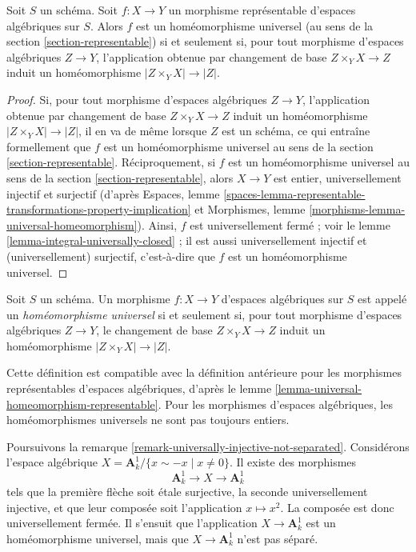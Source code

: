 \begin{lemma}
\label{lemma-universal-homeomorphism-representable}
Soit $S$ un schéma.
Soit $f : X \to Y$ un morphisme représentable d'espaces algébriques sur $S$.
Alors $f$ est un homéomorphisme universel
(au sens de la section \ref{section-representable}) si et seulement si,
pour tout morphisme d'espaces algébriques $Z \to Y$, l'application obtenue par
changement de base $Z \times_Y X \to Z$ induit un homéomorphisme
$|Z \times_Y X| \to |Z|$.
\end{lemma}

\begin{proof}
Si, pour tout morphisme d'espaces algébriques $Z \to Y$, l'application obtenue par
changement de base $Z \times_Y X \to Z$ induit un homéomorphisme
$|Z \times_Y X| \to |Z|$, il en va de même lorsque $Z$ est un schéma,
ce qui entraîne formellement que $f$ est un homéomorphisme universel au
sens de la
section \ref{section-representable}.
Réciproquement, si $f$ est un homéomorphisme universel au sens de la
section \ref{section-representable},
alors $X \to Y$ est entier, universellement injectif et surjectif
(d'après Espaces, lemme
\ref{spaces-lemma-representable-transformations-property-implication}
et
Morphismes, lemme \ref{morphisms-lemma-universal-homeomorphism}).
Ainsi, $f$ est universellement fermé ; voir le
lemme \ref{lemma-integral-universally-closed} ;
il est aussi universellement injectif et (universellement) surjectif, c'est-à-dire que
$f$ est un homéomorphisme universel.
\end{proof}

\begin{definition}
\label{definition-universal-homeomorphism}
Soit $S$ un schéma.
Un morphisme $f : X \to Y$ d'espaces algébriques sur $S$
est appelé un {\it homéomorphisme universel}
si et seulement si, pour tout morphisme d'espaces algébriques $Z \to Y$,
le changement de base $Z \times_Y X \to Z$ induit un homéomorphisme
$|Z \times_Y X| \to |Z|$.
\end{definition}

\noindent
Cette définition est compatible avec la définition antérieure pour les
morphismes représentables d'espaces algébriques, d'après le
lemme \ref{lemma-universal-homeomorphism-representable}.
Pour les morphismes d'espaces algébriques, les homéomorphismes
universels ne sont pas toujours entiers.

\begin{example}
\label{example-universal-homeomorphism}
Poursuivons la
remarque \ref{remark-universally-injective-not-separated}.
Considérons l'espace algébrique
$X = \mathbf{A}^1_k/\{x \sim -x \mid x \not = 0\}$.
Il existe des morphismes
$$
\mathbf{A}^1_k \longrightarrow X \longrightarrow \mathbf{A}^1_k
$$
tels que la première flèche soit étale surjective, la seconde
universellement injective, et que leur composée soit l'application $x \mapsto x^2$.
La composée est donc universellement fermée. Il s'ensuit que
l'application $X \to \mathbf{A}^1_k$ est un homéomorphisme universel, mais que
$X \to \mathbf{A}^1_k$ n'est pas séparé.
\end{example}

